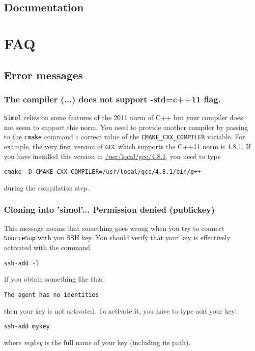 \documentclass[12pt]{book}
\newcommand{\Simol}{\texttt{Simol}\xspace}
\newcommand{\SourceSup}{\texttt{SourceSup}\xspace}
\begin{document}
\section{Documentation}


\chapter{FAQ}

\section{Error messages}


\subsection{The compiler (...) does not support -std=c++11 flag.}

\Simol relies on some features of the 2011 norm of C++ but your compiler does not seem to support this norm. You need to provide another compiler by passing to the \texttt{cmake} command a correct value of the \texttt{CMAKE\_CXX\_COMPILER} variable. For example, the very first version of \texttt{GCC} which supports the C++11 norm is 4.8.1. If you have installed this version in \url{/usr/local/gcc/4.8.1}, you need to type
\lstset{language=bash} 
\begin{lstlisting}
cmake -D CMAKE_CXX_COMPILER=/usr/local/gcc/4.8.1/bin/g++
\end{lstlisting}
during the compilation step.

\subsection{Cloning into 'simol'... Permission denied (publickey)}

This message means that something goes wrong when you try to connect \SourceSup with you SSH key. You should verify that your key is effectively activated with the command
\lstset{language=bash} 
\begin{lstlisting}
ssh-add -l
\end{lstlisting}
If you obtain something like this:
\lstset{language=bash} 
\begin{lstlisting}
The agent has no identities
\end{lstlisting}
then your key is not activated. To activate it, you have to type add your key:
\lstset{language=bash} 
\begin{lstlisting}
ssh-add mykey
\end{lstlisting}
where \textit{mykey} is the full name of your key (including its path).
\end{document}

